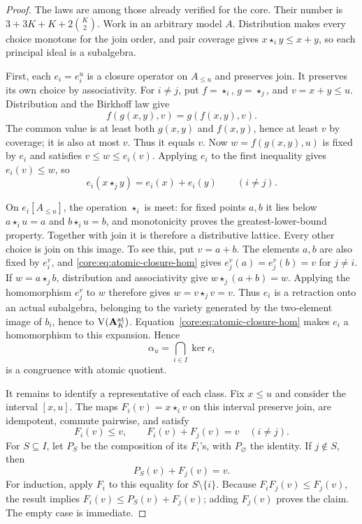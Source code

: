 \begin{proof}
The laws are among those already verified for the core. Their number is
$3+3K+K+2\binom K2$. Work in an arbitrary model $A$. Distribution
makes every choice monotone for the join order, and pair coverage gives
$x\star_i y\leq x+y$, so each principal ideal is a subalgebra.

First, each $e_i=e_i^u$ is a closure operator on $A_{\leq u}$ and
preserves join. It preserves its own choice by associativity. For
$i\ne j$, put $f=\star_i$, $g=\star_j$, and $v=x+y\leq u$.
Distribution and the Birkhoff law give
\[
 f(g(x,y),v)=g(f(x,y),v).
\]
The common value is at least both $g(x,y)$ and $f(x,y)$, hence at
least $v$ by coverage; it is also at most $v$. Thus it equals $v$.
Now $w=f(g(x,y),u)$ is fixed by $e_i$ and satisfies
$v\leq w\leq e_i(v)$. Applying $e_i$ to the first inequality gives
$e_i(v)\leq w$, so
\begin{equation}\label{core:eq:atomic-closure-hom}
 e_i(x\star_j y)=e_i(x)+e_i(y)\qquad(i\ne j).
\end{equation}

On $e_i[A_{\leq u}]$, the operation $\star_i$ is meet: for fixed
points $a,b$ it lies below $a\star_i u=a$ and $b\star_i u=b$,
and monotonicity proves the greatest-lower-bound property. Together
with join it is therefore a distributive lattice. Every other choice
is join on this image. To see this, put $v=a+b$. The elements $a,b$
are also fixed by $e_i^v$, and
\eqref{core:eq:atomic-closure-hom} gives
$e_j^v(a)=e_j^v(b)=v$ for $j\ne i$. If $w=a\star_j b$, distribution
and associativity give $w\star_j(a+b)=w$. Applying the homomorphism
$e_j^v$ to $w$ therefore gives $w=v\star_j v=v$.
Thus $e_i$ is a retraction onto an actual subalgebra, belonging to the variety
generated by the two-element image of $b_i$, hence to
$\operatorname V(\mathbf A_K^{\rm at})$. Equation~\eqref{core:eq:atomic-closure-hom}
makes $e_i$ a homomorphism to this expansion. Hence
\[
 \alpha_u=\bigcap_{i\in I}\ker e_i
\]
is a congruence with atomic quotient.

It remains to identify a representative of each class. Fix $x\leq u$
and consider the interval $[x,u]$. The maps
$F_i(v)=x\star_i v$ on this interval preserve join, are idempotent,
commute pairwise, and satisfy
\[
 F_i(v)\leq v,\qquad F_i(v)+F_j(v)=v\quad(i\ne j).
\]
For $S\subseteq I$, let $P_S$ be the composition of its $F_i$'s,
with $P_\varnothing$ the identity. If $j\notin S$, then
\begin{equation}\label{core:eq:atomic-complementary-maps}
 P_S(v)+F_j(v)=v.
\end{equation}
For induction, apply $F_i$ to this equality for $S\setminus\{i\}$.
Because $F_iF_j(v)\leq F_j(v)$, the result implies
$F_i(v)\leq P_S(v)+F_j(v)$; adding $F_j(v)$ proves the claim.
The empty case is immediate.


\end{proof}
